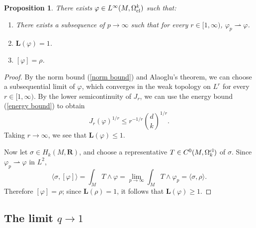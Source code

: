 \documentclass[reqno,11pt]{amsart}
\newcommand{\RR}{\mathbf{R}}
\newcommand{\Comass}{\mathbf L}
\newcommand{\weakto}{\rightharpoonup}
\newtheorem{proposition}[theorem]{Proposition}
\theoremstyle{definition}
\numberwithin{equation}{section}
\begin{document}
\begin{proposition}
There exists $\varphi \in L^\infty(M, \Omega^k_{\rm cl})$ such that:
\begin{enumerate}
\item There exists a subsequence of $p \to \infty$ such that for every $r \in [1, \infty)$, $\varphi_p \weakto \varphi$.
\item $\Comass(\varphi) = 1$.
\item $[\varphi] = \rho$.
\end{enumerate}
\end{proposition}
\begin{proof}
By the norm bound (\ref{norm bound}) and Alaoglu's theorem, we can choose a subsequential limit of $\varphi$, which converges in the weak topology on $L^r$ for every $r \in [1, \infty)$.
By the lower semicontinuity of $J_r$, we can use the energy bound (\ref{energy bound}) to obtain 
$$J_r(\varphi)^{1/r} \leq r^{-1/r} \binom dk^{1/r}.$$
Taking $r \to \infty$, we see that $\Comass(\varphi) \leq 1$.

Now let $\sigma \in H_k(M, \RR)$, and choose a representative $T \in C^0(M, \Omega^{\rm cl}_k)$ of $\sigma$.
Since $\varphi_p \weakto \varphi$ in $L^2$,
$$\langle \sigma, [\varphi]\rangle = \int_M T \wedge \varphi = \lim_{p \to \infty} \int_M T \wedge \varphi_p = \langle \sigma, \rho\rangle.$$
Therefore $[\varphi] = \rho$; since $\Comass(\rho) = 1$, it follows that $\Comass(\varphi) \geq 1$.
\end{proof}

\subsection{The limit \texorpdfstring{$q \to 1$}{q to 1}}

\end{document}
